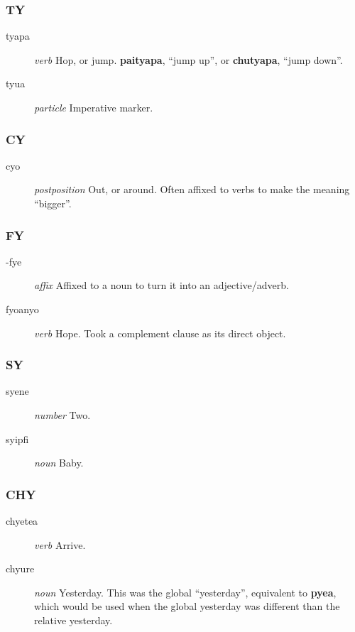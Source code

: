 \documentclass{article}
\begin{document}
\subsubsection{TY}

\begin{description}
\item [tyapa] \emph{verb} Hop, or jump.  \textbf{paityapa}, ``jump up'', or \textbf{chutyapa}, ``jump down''.
\item [tyua] \emph{particle} Imperative marker.
\end{description}

\subsubsection{CY}

\begin{description}
\item [cyo] \emph{postposition} Out, or around.  Often affixed to verbs to make the meaning ``bigger''.
\end{description}

\subsubsection{FY}

\begin{description}
\item [-fye] \emph{affix} Affixed to a noun to turn it into an adjective/adverb.
\item [fyoanyo] \emph{verb} Hope.  Took a complement clause as its direct object.
\end{description}

\subsubsection{SY}

\begin{description}
\item [syene] \emph{number} Two.
\item [syipfi] \emph{noun} Baby.
\end{description}

\subsubsection{CHY}

\begin{description}
\item [chyetea] \emph{verb} Arrive.
\item [chyure] \emph{noun} Yesterday.  This was the global ``yesterday'', equivalent to \textbf{pyea}, which would be used when the global yesterday was different than the relative yesterday.
\end{description}
\end{document}
